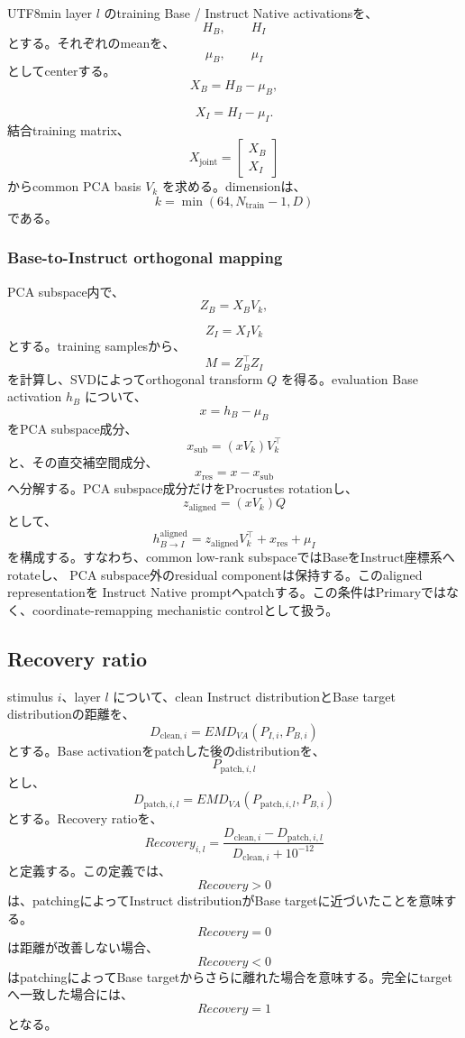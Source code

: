 \documentclass{article} %
\begin{document}
\begin{CJK*}{UTF8}{min}
layer \(l\) のtraining Base / Instruct Native activationsを、
\[
H_B,
\qquad
H_I
\]
とする。それぞれのmeanを、
\[
\mu_B,
\qquad
\mu_I
\]
としてcenterする。
\[
X_B
=
H_B-\mu_B,
\]

\[
X_I
=
H_I-\mu_I.
\]
結合training matrix、
\[
X_{\mathrm{joint}}
=
\begin{bmatrix}
X_B\\
X_I
\end{bmatrix}
\]
からcommon PCA basis \(V_k\) を求める。dimensionは、
\[
k
=
\min
(
64,
N_{\mathrm{train}}-1,
D
)
\]
である。


\subsubsection{Base-to-Instruct orthogonal mapping}

PCA subspace内で、
\[
Z_B
=
X_BV_k,
\]

\[
Z_I
=
X_IV_k
\]
とする。training samplesから、
\[
M
=
Z_B^\top Z_I
\]
を計算し、SVDによってorthogonal transform \(Q\) を得る。evaluation Base activation \(h_B\) について、
\[
x
=
h_B-\mu_B
\]
をPCA subspace成分、
\[
x_{\mathrm{sub}}
=
(xV_k)V_k^\top
\]
と、その直交補空間成分、
\[
x_{\mathrm{res}}
=
x-x_{\mathrm{sub}}
\]
へ分解する。PCA subspace成分だけをProcrustes rotationし、
\[
z_{\mathrm{aligned}}
=
(xV_k)Q
\]
として、
\[
h_{B\rightarrow I}^{\mathrm{aligned}}
=
z_{\mathrm{aligned}}V_k^\top
+
x_{\mathrm{res}}
+
\mu_I
\]
を構成する。すなわち、common low-rank subspaceではBaseをInstruct座標系へrotateし、
PCA subspace外のresidual componentは保持する。このaligned representationを
Instruct Native promptへpatchする。この条件はPrimaryではなく、coordinate-remapping mechanistic controlとして扱う。


\subsection{Recovery ratio}

stimulus \(i\)、layer \(l\) について、clean Instruct distributionとBase target distributionの距離を、
\[
D_{\mathrm{clean},i}
=
EMD_{VA}
(
P_{I,i},
P_{B,i}
)
\]
とする。Base activationをpatchした後のdistributionを、
\[
P_{\mathrm{patch},i,l}
\]
とし、
\[
D_{\mathrm{patch},i,l}
=
EMD_{VA}
(
P_{\mathrm{patch},i,l},
P_{B,i}
)
\]
とする。Recovery ratioを、
\[
Recovery_{i,l}
=
\frac{
D_{\mathrm{clean},i}
-
D_{\mathrm{patch},i,l}
}{
D_{\mathrm{clean},i}
+
10^{-12}
}
\]
と定義する。この定義では、
\[
Recovery>0
\]
は、patchingによってInstruct distributionがBase targetに近づいたことを意味する。
\[
Recovery=0
\]
は距離が改善しない場合、
\[
Recovery<0
\]
はpatchingによってBase targetからさらに離れた場合を意味する。完全にtargetへ一致した場合には、
\[
Recovery=1
\]
となる。



\end{CJK*}
\end{document}
